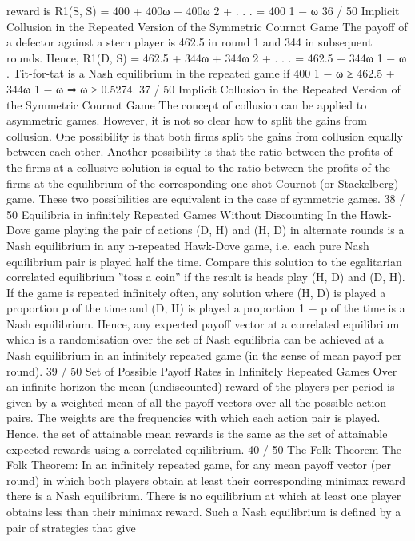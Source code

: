 \documentclass[]{report}
\begin{document}
reward is
R1(S, S) = 400 + 400ω + 400ω
2 + . . . =
400
1 − ω
36 / 50
Implicit Collusion in the Repeated Version of the
Symmetric Cournot Game
The payoff of a defector against a stern player is 462.5 in round 1
and 344 in subsequent rounds. Hence,
R1(D, S) = 462.5 + 344ω + 344ω
2 + . . . = 462.5 +
344ω
1 − ω
.
Tit-for-tat is a Nash equilibrium in the repeated game if
400
1 − ω
≥ 462.5 +
344ω
1 − ω
⇒ ω ≥ 0.5274.
37 / 50
Implicit Collusion in the Repeated Version of the
Symmetric Cournot Game
The concept of collusion can be applied to asymmetric games.
However, it is not so clear how to split the gains from collusion.
One possibility is that both firms split the gains from collusion
equally between each other.
Another possibility is that the ratio between the profits of the firms
at a collusive solution is equal to the ratio between the profits of
the firms at the equilibrium of the corresponding one-shot Cournot
(or Stackelberg) game.
These two possibilities are equivalent in the case of symmetric
games.
38 / 50
Equilibria in infinitely Repeated Games Without
Discounting
In the Hawk-Dove game playing the pair of actions (D, H) and
(H, D) in alternate rounds is a Nash equilibrium in any n-repeated
Hawk-Dove game, i.e. each pure Nash equilibrium pair is played
half the time.
Compare this solution to the egalitarian correlated equilibrium
”toss a coin” if the result is heads play (H, D) and (D, H).
If the game is repeated infinitely often, any solution where (H, D)
is played a proportion p of the time and (D, H) is played a
proportion 1 − p of the time is a Nash equilibrium.
Hence, any expected payoff vector at a correlated equilibrium
which is a randomisation over the set of Nash equilibria can be
achieved at a Nash equilibrium in an infinitely repeated game (in
the sense of mean payoff per round).
39 / 50
Set of Possible Payoff Rates in Infinitely Repeated Games
Over an infinite horizon the mean (undiscounted) reward of the
players per period is given by a weighted mean of all the payoff
vectors over all the possible action pairs. The weights are the
frequencies with which each action pair is played.
Hence, the set of attainable mean rewards is the same as the set of
attainable expected rewards using a correlated equilibrium.
40 / 50
The Folk Theorem
The Folk Theorem: In an infinitely repeated game, for any mean
payoff vector (per round) in which both players obtain at least
their corresponding minimax reward there is a Nash equilibrium.
There is no equilibrium at which at least one player obtains less
than their minimax reward.
Such a Nash equilibrium is defined by a pair of strategies that give
\end{document}
